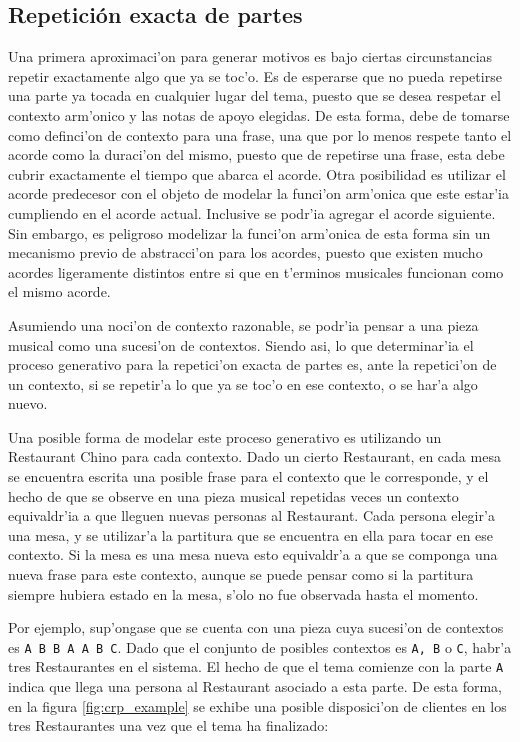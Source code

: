 \subsection{Repetici\'on exacta de partes}
\label{sec:crp_model}
Una primera aproximaci'on para generar motivos es bajo ciertas circunstancias repetir exactamente algo que ya se toc'o. Es de esperarse que no pueda repetirse
una parte ya tocada en cualquier lugar del tema, puesto que se desea respetar el contexto arm'onico y las notas de apoyo elegidas. De esta forma, debe
de tomarse como definci'on de contexto para una frase, una que por lo menos respete tanto el acorde como la duraci'on del mismo, puesto que de repetirse una frase, esta 
debe cubrir exactamente el tiempo que abarca el acorde. Otra posibilidad es utilizar el acorde predecesor con el objeto
de modelar la funci'on arm'onica que este estar'ia cumpliendo en el acorde actual. Inclusive se podr'ia agregar el acorde siguiente. Sin embargo, es peligroso modelizar
la funci'on arm'onica de esta forma sin un mecanismo previo de abstracci'on para los acordes, puesto que existen mucho acordes ligeramente distintos entre si que en t'erminos
musicales funcionan como el mismo acorde.

Asumiendo una noci'on de contexto razonable, se podr'ia pensar a una pieza musical como una sucesi'on de contextos. Siendo asi, lo que determinar'ia el proceso generativo para 
la repetici'on exacta de partes es, ante la repetici'on de un contexto, si se repetir'a lo que ya se toc'o en ese contexto, o se har'a
algo nuevo. 

Una posible forma de modelar este proceso generativo es utilizando un Restaurant Chino para cada contexto. Dado un cierto Restaurant, en cada mesa se encuentra
escrita una posible frase para el contexto que le corresponde, y el hecho de que se observe en una pieza musical repetidas veces un contexto equivaldr'ia a que lleguen nuevas
personas al Restaurant. Cada persona elegir'a una mesa, y se utilizar'a la partitura que se encuentra en ella para tocar en ese contexto. Si la mesa es una mesa 
nueva esto equivaldr'a a que se componga una nueva frase para este contexto, aunque se puede pensar como si la partitura siempre hubiera estado en la mesa, s'olo 
no fue observada hasta el momento.  

Por ejemplo, sup'ongase que se cuenta con una pieza cuya sucesi'on de contextos es \texttt{A B B A A B C}. Dado que el conjunto de posibles contextos es
\texttt{A, B} o \texttt{C}, habr'a tres Restaurantes en el sistema. El hecho de que el tema comienze con la parte \texttt{A} indica que llega una persona al 
Restaurant asociado a esta parte. De esta forma, en la figura \ref{fig:crp_example} se exhibe una posible disposici'on de clientes en los tres Restaurantes 
una vez que el tema ha finalizado:


